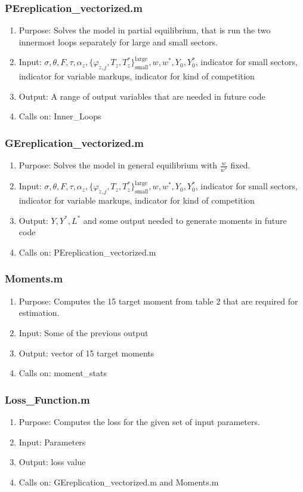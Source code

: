 \documentclass[12pt,a4paper,oneside]{article}
\begin{document}
\subsubsection{PEreplication\_vectorized.m}
\begin{enumerate}
\item Purpose: Solves the model in partial equilibrium, that is run the two innermost loops separately for large and small sectors.
\item Input: $\sigma, \theta, F, \tau, \alpha_z, \{\varphi_{z,j}, T_z, T_z^*\}_{\text{small}}^{\text{large}}, w, w^*, Y_0, Y_0^*$, indicator for small sectors, indicator for variable markups, indicator for kind of competition
\item Output: A range of output variables that are needed in future code
\item Calls on: Inner\_Loops
\end{enumerate}
\subsubsection{GEreplication\_vectorized.m}
\begin{enumerate}
\item Purpose: Solves the model in general equilibrium with $\frac{w}{w^*}$ fixed. 
\item Input: $\sigma, \theta, F, \tau, \alpha_z, \{\varphi_{z,j}, T_z, T_z^*\}_{\text{small}}^{\text{large}}, w, w^*, Y_0, Y_0^*$, indicator for small sectors, indicator for variable markups, indicator for kind of competition
\item Output: $Y, Y^*, L^*$ and some output needed to generate moments in future code
\item Calls on: PEreplication\_vectorized.m
\end{enumerate}
\subsubsection{Moments.m}
\begin{enumerate}
\item Purpose: Computes the 15 target moment from table 2 that are required for estimation.
\item Input: Some of the previous output
\item Output: vector of 15 target moments
\item Calls on: moment\_stats
\end{enumerate}
\subsubsection{Loss\_Function.m}
\begin{enumerate}
\item Purpose: Computes the loss for the given set of input parameters.
\item Input: Parameters 
\item Output: loss value
\item Calls on: GEreplication\_vectorized.m and Moments.m
\end{enumerate}
\end{document}
